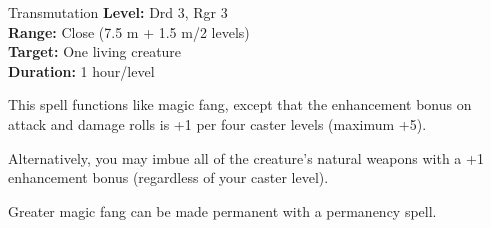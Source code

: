 {Transmutation}
{
	\textbf{Level:}
	Drd 3, Rgr 3\\
	\textbf{Range:}
	Close (7.5 m + 1.5 m/2 levels)\\
	\textbf{Target:}
	One living creature\\
	\textbf{Duration:}
	1 hour/level\\
}
{
	This spell functions like magic fang, except that the enhancement bonus on attack and damage rolls is +1 per four caster levels (maximum +5).

	Alternatively, you may imbue all of the creature's natural weapons with a +1 enhancement bonus (regardless of your caster level).

	Greater magic fang can be made permanent with a permanency spell.

}
